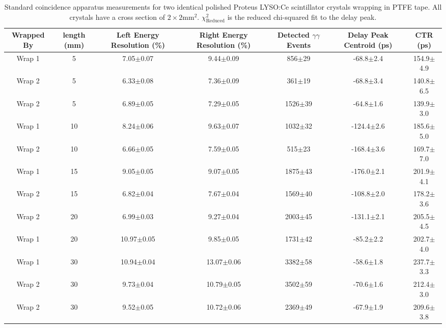 \begin{table}
\caption{\label{tab:standardctr} Standard coincidence apparatus measurements for two identical polished Proteus LYSO:Ce scintillator crystals wrapping in PTFE tape. All crystals have a cross section of $2\times2$mm$^2$. $\chi^2_\text{Reduced}$ is the reduced chi-squared fit to the delay peak.}
\begin{tabular}{ccccccc}
\hline
Wrapped By &  length (mm) & Left Energy Resolution (\%) & Right Energy Resolution (\%) & Detected $\gamma\gamma$ Events & Delay Peak Centroid (ps) & CTR (ps)\\
\hline
    Wrap 1 &      5 &   7.05$\pm$0.07 &   9.44$\pm$0.09 &   856$\pm$29 &   -68.8$\pm$2.4 &  154.9$\pm$4.9 \\
    Wrap 2 &      5 &   6.33$\pm$0.08 &   7.36$\pm$0.09 &   361$\pm$19 &   -68.8$\pm$3.4 &  140.8$\pm$6.5 \\
    Wrap 2 &      5 &   6.89$\pm$0.05 &   7.29$\pm$0.05 &  1526$\pm$39 &   -64.8$\pm$1.6 &  139.9$\pm$3.0 \\
    Wrap 1 &     10 &   8.24$\pm$0.06 &   9.63$\pm$0.07 &  1032$\pm$32 &  -124.4$\pm$2.6 &  185.6$\pm$5.0 \\
    Wrap 2 &     10 &   6.66$\pm$0.05 &   7.59$\pm$0.05 &   515$\pm$23 &  -168.4$\pm$3.6 &  169.7$\pm$7.0 \\
    Wrap 1 &     15 &   9.05$\pm$0.05 &   9.07$\pm$0.05 &  1875$\pm$43 &  -176.0$\pm$2.1 &  201.9$\pm$4.1 \\
    Wrap 2 &     15 &   6.82$\pm$0.04 &   7.67$\pm$0.04 &  1569$\pm$40 &  -108.8$\pm$2.0 &  178.2$\pm$3.6 \\
    Wrap 2 &     20 &   6.99$\pm$0.03 &   9.27$\pm$0.04 &  2003$\pm$45 &  -131.1$\pm$2.1 &  205.5$\pm$4.5 \\
    Wrap 1 &     20 &  10.97$\pm$0.05 &   9.85$\pm$0.05 &  1731$\pm$42 &   -85.2$\pm$2.2 &  202.7$\pm$4.0 \\
    Wrap 1 &     30 &  10.94$\pm$0.04 &  13.07$\pm$0.06 &  3382$\pm$58 &   -58.6$\pm$1.8 &  237.7$\pm$3.3 \\
    Wrap 2 &     30 &   9.73$\pm$0.04 &  10.79$\pm$0.05 &  3502$\pm$59 &   -70.6$\pm$1.6 &  212.4$\pm$3.0 \\
    Wrap 2 &     30 &   9.52$\pm$0.05 &  10.72$\pm$0.06 &  2369$\pm$49 &   -67.9$\pm$1.9 &  209.6$\pm$3.8 \\
\hline
\end{tabular}
\end{table}


